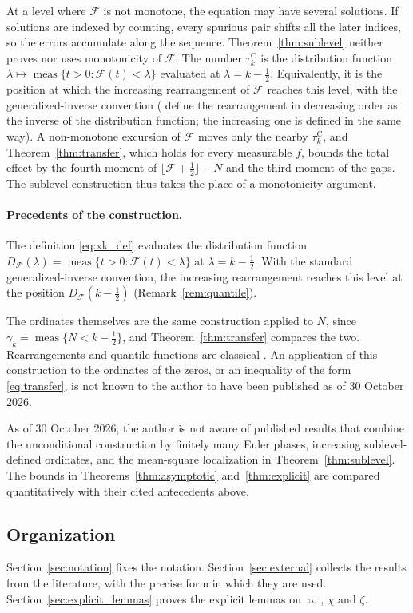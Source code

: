 \documentclass[11pt,a4paper]{article}
\makeatletter
\numberwithin{equation}{section}
\DeclareRobustCommand{\CGref}[1]{\ref{#1}}
\DeclareRobustCommand{\CGeqref}[1]{\eqref{#1}}
\DeclareRobustCommand{\CGcite}[2][]{\if\relax\detokenize{#1}\relax\cite{#2}\else\cite[#1]{#2}\fi}
\let\CG@origref\ref
\let\CG@origeqref\eqref
\newcommand{\CG@gettip}[1]{\@ifundefined{CGTip@#1}{#1}{\csname CGTip@#1\endcsname}}
\newcommand{\CG@getbib}[1]{\@ifundefined{CGBib@#1}{#1}{\csname CGBib@#1\endcsname}}
\DeclareRobustCommand{\CGref}[1]{\pdftooltip{\CG@origref{#1}}{\CG@gettip{#1}}}
\DeclareRobustCommand{\CGeqref}[1]{\pdftooltip{\CG@origeqref{#1}}{\CG@gettip{#1}}}
\DeclareRobustCommand{\CGcite}[2][]{\pdftooltip{\if\relax\detokenize{#1}\relax\cite{#2}\else\cite[#1]{#2}\fi}{\CG@getbib{#2}}}
\theoremstyle{definition}
\theoremstyle{remark}
\newcommand{\Fc}{\mathcal F}
\newcommand{\meas}{\operatorname{meas}}
\makeatother
\begin{document}
At a level where $\Fc$ is not monotone, the equation may have several solutions. If solutions are indexed by counting, every spurious pair shifts all the later indices, so the errors accumulate along the sequence. Theorem~\CGref{thm:sublevel} neither proves nor uses monotonicity of $\Fc$. The number $\tau_{k}^{\mathrm C}$ is the distribution function $\lambda\mapsto\meas\{t>0:\Fc(t)<\lambda\}$ evaluated at $\lambda=k-\frac12$. Equivalently, it is the position at which the increasing rearrangement of $\Fc$ reaches this level, with the generalized-inverse convention (\CGcite[\S10.12]{HardyLittlewoodPolya1934} define the rearrangement in decreasing order as the inverse of the distribution function; the increasing one is defined in the same way). A non-monotone excursion of $\Fc$ moves only the nearby $\tau_{k}^{\mathrm C}$, and Theorem~\CGref{thm:transfer}, which holds for every measurable $f$, bounds the total effect by the fourth moment of $\lfloor\Fc+\frac12\rfloor-N$ and the third moment of the gaps. The sublevel construction thus takes the place of a monotonicity argument.

\paragraph{Precedents of the construction.}
The definition \CGeqref{eq:xk_def} evaluates the distribution function $D_{\Fc}(\lambda)=\meas\{t>0:\Fc(t)<\lambda\}$ at $\lambda=k-\frac12$. With the standard generalized-inverse convention, the increasing rearrangement reaches this level at the position $D_{\Fc}(k-\frac12)$ (Remark~\CGref{rem:quantile}).

The ordinates themselves are the same construction applied to $N$, since $\gamma_k=\meas\{N<k-\frac12\}$, and Theorem~\CGref{thm:transfer} compares the two. Rearrangements and quantile functions are classical \CGcite[Ch.~X]{HardyLittlewoodPolya1934}. An application of this construction to the ordinates of the zeros, or an inequality of the form \CGeqref{eq:transfer}, is not known to the author to have been published as of 30 October 2026.

As of 30 October 2026, the author is not aware of published results that combine the unconditional construction by finitely many Euler phases, increasing sublevel-defined ordinates, and the mean-square localization in Theorem~\CGref{thm:sublevel}. The bounds in Theorems~\CGref{thm:asymptotic} and~\CGref{thm:explicit} are compared quantitatively with their cited antecedents above.

\subsection{Organization}
Section~\CGref{sec:notation} fixes the notation. Section~\CGref{sec:external} collects the results from the literature, with the precise form in which they are used. Section~\CGref{sec:explicit_lemmas} proves the explicit lemmas on $\varpi$, $\chi$ and $\zeta$.
\end{document}
